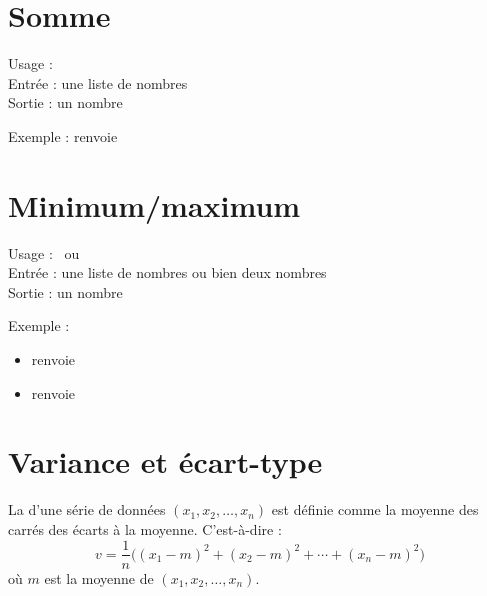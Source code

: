 \documentclass[11pt,class=report,crop=false]{standalone}
\begin{document}
\newcommand{\badletter}[1]{\underline{\textcolor{red}{#1}}}




\newpage

    \section*{Somme}
    
  \begin{fonctionpython}
   Usage : \\
   Entrée : une liste de nombres\\
   Sortie : un nombre
  
  \medskip
     
   Exemple :  renvoie 
  \end{fonctionpython}   

\newpage  
    \section*{Minimum/maximum}  
    
    
  \begin{fonctionpython}
   Usage :  \  ou \  \\
   Entrée : une liste de nombres ou bien deux nombres\\
   Sortie : un nombre
  
  \medskip
     
   Exemple : 
  \begin{itemize}  
    \item {} renvoie   
    \item {} renvoie 
  \end{itemize}    

  \end{fonctionpython}   
  
\newpage 
 
  \section*{Variance et écart-type}
  
 La  d'une série de données $(x_1,x_2,\ldots,x_n)$ est définie comme la moyenne des carrés des écarts à la moyenne. C'est-à-dire :
  $$v = \frac{1}{n}\big((x_1-m)^2 + (x_2-m)^2 + \cdots + (x_n-m)^2\big)$$
  où $m$ est la moyenne de $(x_1,x_2,\ldots,x_n)$.
  
\end{document}
